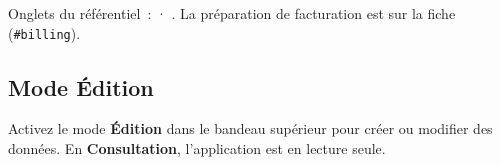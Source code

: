 Onglets du référentiel~:  · . La préparation de facturation est sur la fiche \structure{} (\texttt{\#billing}).


\subsection{Mode Édition}

Activez le mode \textbf{Édition} dans le bandeau supérieur pour créer ou modifier des données. En \textbf{Consultation}, l'application est en lecture seule.
